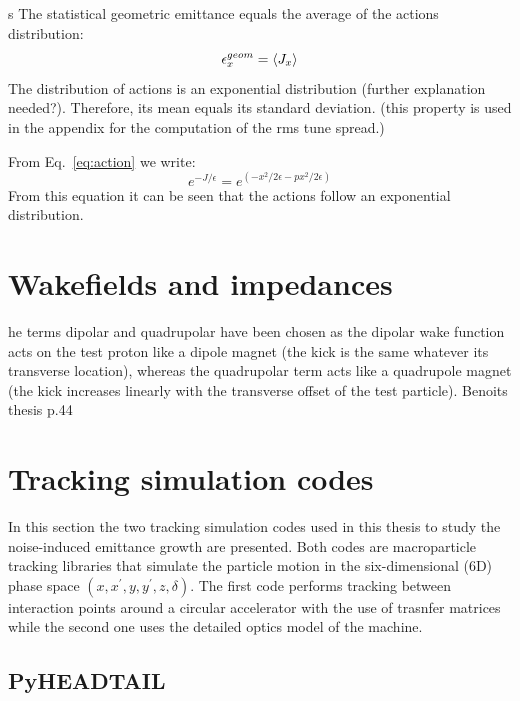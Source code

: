 {{s
The statistical geometric emittance equals the average of the actions distribution:
\begin{equation}\label{eq:geom_emit_actions}
    {\epsilon_x^{geom}} = \langle {J_x} \rangle
\end{equation}
The distribution of actions is an exponential distribution (further explanation needed?). Therefore, its mean equals its standard deviation. (this property is used in the appendix for the computation of the rms tune spread.)

From Eq.~\eqref{eq:action} we write:
\begin{equation}\label{eq:Jy_exp_distr}
    e^{-J/\epsilon} = e^{(-x^2/2\epsilon - px^2/2\epsilon)}
\end{equation}
From this equation it can be seen that the actions follow an exponential distribution. 

\section{Wakefields and impedances}\label{sec:wakefields_theory}

he terms dipolar and quadrupolar have been chosen as the dipolar wake function acts on the test proton like a dipole magnet (the kick is the same whatever its transverse location), whereas the quadrupolar term acts like a quadrupole magnet (the kick increases linearly with the transverse offset of the test particle). Benoits thesis p.44


\section{Tracking simulation codes}\label{sec:simualtion_codes}
In this section the two tracking simulation codes used in this thesis to study the noise-induced emittance growth are presented. Both codes are macroparticle tracking libraries that simulate the particle motion in the six-dimensional (6D) phase space $(x, x^\prime, y, y^\prime, z, \delta)$. The first code performs tracking between interaction points around a circular accelerator with the use of trasnfer matrices while the second one uses the detailed optics model of the machine.

\subsection{PyHEADTAIL}\label{subsec:pyheadtail}

}}

